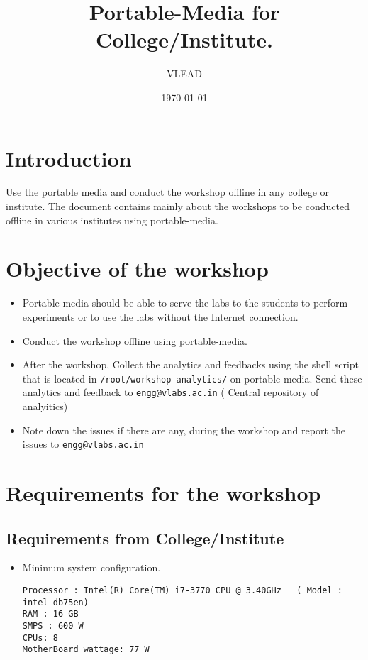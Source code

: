 \documentclass[11pt]{article}
\author{VLEAD}
\date{\today}
\title{Portable-Media for College/Institute.}
\begin{document}
\maketitle
\tableofcontents


\section{Introduction}
\label{sec-1}
Use the portable media and conduct the workshop offline in any
college or institute.
The document contains mainly about the workshops to be conducted offline in various institutes using portable-media.
\section{Objective of the workshop}
\label{sec-2}
\begin{itemize}
\item Portable media should be able to serve the labs to the students
to perform experiments or to use the labs without the Internet
connection.

\item Conduct the workshop offline using portable-media.

\item After the workshop, Collect the analytics and feedbacks using the
shell script that is located in \texttt{/root/workshop-analytics/} on
portable media. Send these analytics and feedback to
\texttt{engg@vlabs.ac.in} ( Central repository of analyitics)

\item Note down the issues if there are any, during the workshop and
report the issues to \texttt{engg@vlabs.ac.in}
\end{itemize}

\section{Requirements for the workshop}
\label{sec-3}
\subsection{Requirements from College/Institute}
\label{sec-3-1}
\begin{itemize}
\item Minimum system configuration.
\begin{verbatim}
Processor : Intel(R) Core(TM) i7-3770 CPU @ 3.40GHz   ( Model : intel-db75en)
RAM : 16 GB
SMPS : 600 W
CPUs: 8
MotherBoard wattage: 77 W
\end{verbatim}
\end{itemize}
\end{document}
